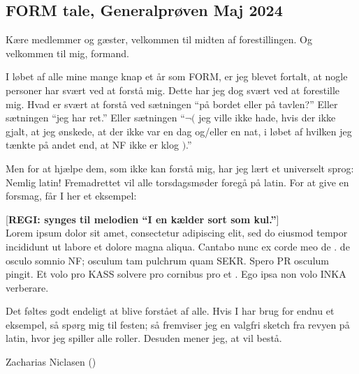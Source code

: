 \subsection{FORM tale, Generalprøven Maj 2024}

\noindent Kære medlemmer og gæster, velkommen til midten af forestillingen. Og velkommen til mig, \TKETS formand.

\noindent I løbet af alle mine mange knap et år som FORM, er jeg blevet fortalt, at nogle personer har svært ved at forstå mig. Dette har jeg dog svært ved at forestille mig. Hvad er svært at forstå ved sætningen ``på bordet eller på tavlen?'' Eller sætningen ``jeg har ret.'' Eller sætningen ``\(\neg(\) jeg ville ikke hade, hvis der ikke gjalt, at jeg ønskede, at der ikke var en dag og/eller en nat, i løbet af hvilken jeg tænkte på andet end, at NF ikke er klog \()\).''

\noindent Men for at hjælpe dem, som ikke kan forstå mig, har jeg lært et universelt sprog: Nemlig latin! Fremadrettet vil alle torsdagsmøder foregå på latin. For at give en forsmag, får I her et eksempel:

[\textbf{REGI: synges til melodien ``I en kælder sort som kul.''}]\\
\noindent Lorem ipsum dolor sit amet, consectetur adipiscing elit, sed do eiusmod tempor incididunt ut labore et dolore magna aliqua. Cantabo nunc ex corde meo de \TKET. de osculo somnio NF; osculum tam pulchrum quam SEKR. Spero PR osculum pingit. Et volo pro KASS solvere pro cornibus pro \CERM et \VC. Ego ipsa non volo INKA verberare.

\noindent Det føltes godt endeligt at blive forstået af alle. Hvis I har brug for endnu et eksempel, så spørg mig til festen; så fremviser jeg en valgfri sketch fra revyen på latin, hvor jeg spiller alle roller. Desuden mener jeg, at \TKET vil bestå.

\begin{Footer}
	Zacharias Niclasen (\CERM)
\end{Footer}

\vfill
{}
\vfill